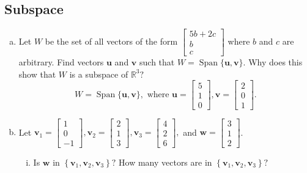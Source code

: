 \subsection{Subspace}
\begin{enumerate}[(a)]
    \item
    Let $W$ be the set of all vectors of the form $\left[\begin{array}{c}5 b+2 c \\ b \\ c\end{array}\right]$ where $b$ and $c$ are arbitrary. Find vectors $\mathbf{u}$ and $\mathbf{v}$ such that $W=\operatorname{Span}\{\mathbf{u}, \mathbf{v}\}.$ Why does this show that $W$ is a subspace of $\mathbb{R}^{3}?$
    $$
    W=\operatorname{Span}\{\mathbf{u}, \mathbf{v}\}, \text { where } \mathbf{u}=\left[\begin{array}{l} 5 \\ 1 \\ 0 \end{array}\right], \mathbf{v}=\left[\begin{array}{l} 2 \\ 0 \\ 1 \end{array}\right].
    $$
    \item
    Let $\mathbf{v}_{1}=\left[\begin{array}{r}1 \\ 0 \\ -1\end{array}\right], \mathbf{v}_{2}=\left[\begin{array}{l}2 \\ 1 \\ 3\end{array}\right], \mathbf{v}_{3}=\left[\begin{array}{l}4 \\ 2 \\ 6\end{array}\right],$ and $\mathbf{w}=\left[\begin{array}{l}3 \\ 1 \\ 2\end{array}\right]$.
    \begin{enumerate}[(i)]
        \item Is $\mathbf{w}$ in $\left\{\mathbf{v}_{1}, \mathbf{v}_{2}, \mathbf{v}_{3}\right\} ?$ How many vectors are in $\left\{\mathbf{v}_{1}, \mathbf{v}_{2}, \mathbf{v}_{3}\right\}?$\\

\end{enumerate}
\end{enumerate}
